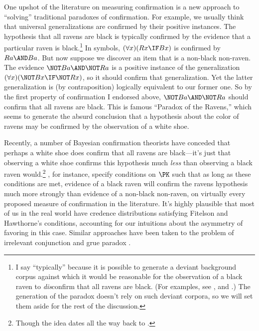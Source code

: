 One upshot of the literature on measuring confirmation is a new approach to ``solving'' traditional paradoxes of confirmation. For example, we usually think that universal generalizations are confirmed by their positive instances. The hypothesis that all ravens are black is typically confirmed by the evidence that a particular raven is black.\footnote
{I say ``typically'' because it is possible to generate a deviant background corpus against which it would be reasonable for the observation of a black raven to \emph{dis}confirm that all ravens are black. (For examples, see \citealp{SwinburneParadoxes}, and \citealp[Chapter\ 2]{RosenkrantzParadoxes}.) The generation of the paradox doesn't rely on such deviant corpora, so we will set them aside for the rest of the discussion.}
 In symbols, $(\forall x)(Rx \IF Bx)$ is confirmed by $Ra \AND Ba$. But now suppose we discover an item that is a non-black non-raven. The evidence $\NOT Ba \AND \NOT Ra$ is a positive instance of the generalization $(\forall x)(\NOT Bx \IF \NOT Rx)$, so it should confirm that generalization. Yet the latter generalization is (by contraposition) logically equivalent to our former one. So by the first property of confirmation I endorsed above, $\NOT Ba \AND \NOT Ra$ should confirm that all ravens are black. This is  famous ``Paradox of the Ravens,'' which seems to generate the absurd conclusion that a hypothesis about the color of ravens may be confirmed by the observation of a white shoe.

Recently, a number of Bayesian confirmation theorists have conceded that perhaps a white shoe does confirm that all ravens are black---it's just that observing a white shoe confirms this hypothesis much \emph{less} than observing a black raven would.\footnote
{Though the idea dates all the way back to \citet{HosiassonLindenbaumConfirmation}.}
 \citet{FitelsonHawthorneRavens}, for instance, specify conditions on $\PK$ such that as long as these conditions are met, evidence of a black raven will confirm the ravens hypothesis much more strongly than evidence of a non-black non-raven, on virtually every proposed measure of confirmation in the literature. It's highly plausible that most of us in the real world have credence distributions satisfying Fitelson and Hawthorne's conditions, accounting for our intuitions about the asymmetry of favoring in this case. Similar approaches have been taken to the problem of irrelevant conjunction \citep{HawthorneFitelsonResolving} and  grue paradox \citep{ChiharaQuine,EellsDecision}.

